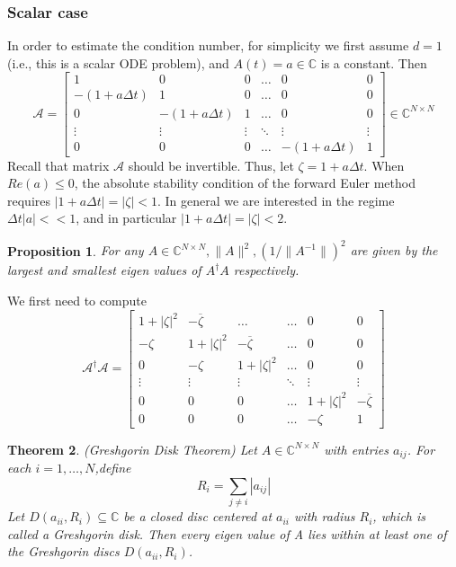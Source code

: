 \documentclass[12pt, oneside]{book}
\newtheorem{theorem}{Theorem}[section]
\newtheorem{proposition}[theorem]{Proposition}
\theoremstyle{definition}
\theoremstyle{definition}
\theoremstyle{remark}
\begin{document}
\subsubsection{Scalar case} 
In order to estimate the condition number, for simplicity we first assume $d=1$ (i.e., this is a scalar ODE problem), and $A(t)=a \in \mathbb{C}$ is a constant. Then
\[
\mathcal{A}=\begin{bmatrix} 1 & 0 & 0 & \ldots & 0 & 0\\
-(1+a\Delta t) & 1 & 0 & \ldots & 0 & 0 \\
0 & -(1+a\Delta t) & 1 & \ldots & 0 & 0 \\
\vdots & \vdots & \vdots & \ddots & \vdots & \vdots \\
0 & 0 & 0 & \ldots & -(1+a\Delta t) & 1 \end{bmatrix} \in \mathbb{C}^{N \times N}
\]
Recall that matrix $\mathcal{A}$ should be invertible. Thus, let $\zeta =1+a\Delta t$. When $Re(a)\leq 0$, the absolute stability condition of the forward Euler method requires $|1+a\Delta t|=|\zeta| < 1$. In general we are interested in the regime $\Delta t|a|<<1$, and in particular $|1+a\Delta t|=|\zeta|<2$.
\begin{proposition}
    For any $A \in \mathbb{C}^{N \times N},\|A\|^2,(1/\|A^{-1}\|)^2$ are given by the largest and smallest eigen values of $A^{\dagger}A$ respectively.
\end{proposition}
    We first need to compute
    \[
    \mathcal{A}^{\dagger}\mathcal{A}=\begin{bmatrix} 1+ |\zeta|^2 & -\overline{\zeta} & \ldots & \ldots & 0 & 0 \\ -\zeta & 1+|\zeta|^2 & -\overline{\zeta} & \ldots & 0 & 0\\
    0 & -\zeta & 1+|\zeta|^2 & \ldots & 0 & 0 \\
    \vdots & \vdots & \vdots & \ddots & \vdots & \vdots \\
    0 & 0 & 0 & \ldots & 1+|\zeta|^2 & -\overline{\zeta} \\
    0 & 0 & 0 & \ldots & -\zeta & 1 \end{bmatrix}
    \]
\begin{theorem} (Greshgorin Disk Theorem) Let $A \in \mathbb{C}^{N \times N}$ with entries $a_{ij}$. For each $i=1,\ldots,N$,define
    \[
    R_{i}=\sum_{j\neq i}|a_{ij}|
    \]
    Let $D(a_{ii},R_i) \subseteq \mathbb{C}$ be a closed disc centered at $a_{ii}$ with radius $R_i$, which is called a Greshgorin disk. Then every eigen value of A lies within at least one of the Greshgorin discs $D(a_{ii},R_i)$.
\end{theorem}
\end{document}
